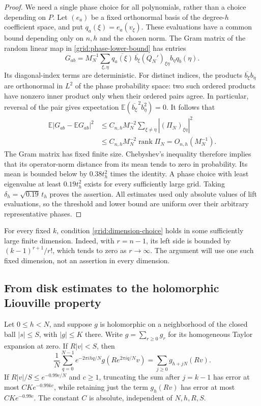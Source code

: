 \begin{proof}
We need a single phase choice for all polynomials, rather than a
choice depending on $P$.  Let $(e_a)$ be a fixed orthonormal basis
of the degree-$h$ coefficient space, and put $q_a(\xi)=e_a(v_\xi)$.
These evaluations have a common bound depending only on $n,h$ and
the chosen norm.  The Gram matrix of the random linear map in
\eqref{grid:phase-lower-bound} has entries
\[
 G_{ab}=M_N^{-1}\sum_{\xi,\eta}
       \overline{q_a(\xi)}\,\overline{b_\xi}
       (Q_N')_{\xi\eta}b_\eta q_b(\eta).
\]
Its diagonal-index terms are deterministic.  For distinct indices,
the products $\overline{b_\xi}b_\eta$ are orthonormal in
$L^2$ of the phase probability space: two such ordered products
have nonzero inner product only when their ordered pairs agree.
In particular, reversal of the pair gives expectation
$\mathbb E(\overline{b_\xi}^{\,2}b_\eta^2)=0$.
It follows that
\[
 \begin{split}
 \mathbb E|G_{ab}-\mathbb EG_{ab}|^2
 &\le C_{n,h}M_N^{-2}
       \sum_{\xi\ne\eta}|(\Pi_N)_{\xi\eta}|^2\\
 &\le C_{n,h}M_N^{-2}\operatorname{rank}\Pi_N
   =O_{n,h}(M_N^{-1}).
 \end{split}
\]
The Gram matrix has fixed finite size.  Chebyshev's inequality
therefore implies that its operator-norm distance from its mean
tends to zero in probability.  Its mean is bounded below by
$0.38t_h^2$ times the identity.  A phase choice with least
eigenvalue at least $0.19t_h^2$ exists for every sufficiently large
grid.  Taking $\delta_h=\sqrt{0.19}\,t_h$ proves the assertion.
All estimates used only absolute values of lift evaluations, so
the threshold and lower bound are uniform over their arbitrary
representative phases.
\end{proof}

\begin{remark}
\label{grid:finite-dimension}
For every fixed $k$, condition \eqref{grid:dimension-choice} holds
in some sufficiently large finite dimension.  Indeed, with
$r=n-1$, its left side is bounded by
$(k-1)^{r+1}/r!$, which tends to zero as $r\to\infty$.
The argument will use one such fixed dimension, not an assertion
in every dimension.
\end{remark}

\subsection{From disk estimates to the holomorphic Liouville property}

\begin{lemma}
\label{grid:frequency}
Let $0\le h<N$, and suppose $g$ is holomorphic on a neighborhood of
the closed ball $|s|\le S$, with $|g|\le K$ there.  Write
$g=\sum_{r\ge0}g_r$ for its homogeneous Taylor expansion at zero.
If $R|v|<S$, then
\[
 \frac1N\sum_{q=0}^{N-1}e^{-2\pi i hq/N}
       g(Re^{2\pi i q/N}v)
   =\sum_{j\ge0}g_{h+jN}(Rv).
\]
If $R|v|/S\le e^{-0.99c/N}$ and $c\ge1$, truncating the sum after
$j=k-1$ has error at most $C K e^{-0.99kc}$, while retaining just
the term $g_h(Rv)$ has error at most $C K e^{-0.99c}$.  The constant
$C$ is absolute, independent of $N,h,R,S$.
\end{lemma}

